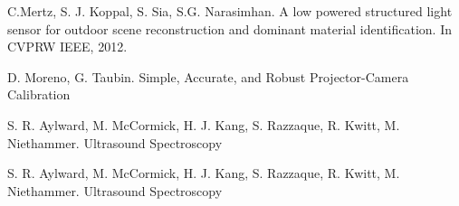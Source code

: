 \documentclass{llncs}
\begin{document}
%
%
\begin{thebibliography}{}
%
C.Mertz, S. J. Koppal, S. Sia, S.G. Narasimhan. A low powered structured light sensor for outdoor scene reconstruction and dominant material identification. In CVPRW IEEE, 2012.

D. Moreno, G. Taubin. Simple, Accurate, and Robust Projector-Camera Calibration

S. R. Aylward, M. McCormick, H. J. Kang, S. Razzaque, R. Kwitt, M. Niethammer. Ultrasound Spectroscopy

S. R. Aylward, M. McCormick, H. J. Kang, S. Razzaque, R. Kwitt, M. Niethammer. Ultrasound Spectroscopy

\end{thebibliography}
\end{document}
